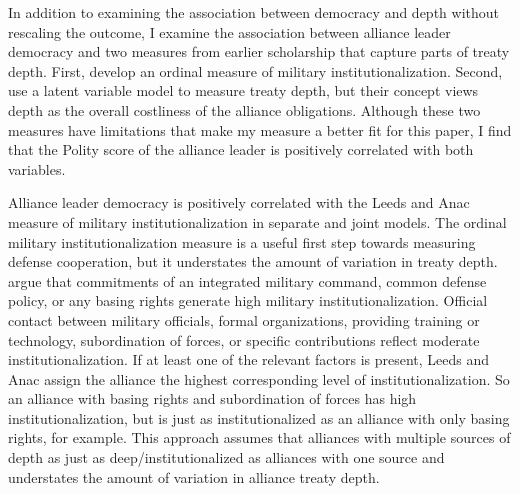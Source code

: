 \documentclass[12pt]{article}
\begin{document}
In addition to examining the association between democracy and depth without rescaling the outcome, I examine the association between alliance leader democracy and two measures from earlier scholarship that capture parts of treaty depth. 
First, \citet{LeedsAnac2005} develop an ordinal measure of military institutionalization.
Second, \citet{BensonClinton2016} use a latent variable model to measure treaty depth, but their concept views depth as the overall costliness of the alliance obligations. 
Although these two measures have limitations that make my measure a better fit for this paper, I find that the Polity score of the alliance leader is positively correlated with both variables.


Alliance leader democracy is positively correlated with the Leeds and Anac measure of military institutionalization in separate and joint models.
The ordinal military institutionalization measure is a useful first step towards measuring defense cooperation, but it understates the amount of variation in treaty depth. 
\citet{LeedsAnac2005} argue that commitments of an integrated military command, common defense policy, or any basing rights generate high military institutionalization. 
Official contact between military officials, formal organizations, providing training or technology, subordination of forces, or specific contributions reflect moderate institutionalization. 
If at least one of the relevant factors is present, Leeds and Anac assign the alliance the highest corresponding level of institutionalization. 
So an alliance with basing rights and subordination of forces has high institutionalization, but is just as institutionalized as an alliance with only basing rights, for example. 
This approach assumes that alliances with multiple sources of depth as just as deep/institutionalized as alliances with one source and understates the amount of variation in alliance treaty depth.
\end{document}
